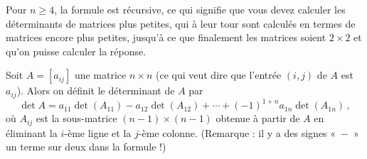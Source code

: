 Pour $n\geq 4$, la formule est récursive, ce qui signifie que vous devez calculer 
les déterminants de matrices plus petites, qui à leur tour sont calculés en termes 
de matrices encore plus petites, jusqu'à ce que finalement les matrices soient $2\times 2$ et qu'on puisse calculer la réponse.

\begin{definition}
Soit $A = [a_{ij}]$ une matrice $n\times n$ (ce qui veut dire que l'entr\'ee $(i,j)$ de $A$ est $a_{ij}$).
Alors on d\'efinit le d\'eterminant de $A$ par
$$
\det A = a_{11}\det(A_{11}) - a_{12}\det(A_{12}) + \cdots + (-1)^{1+n}a_{1n}\det(A_{1n})\,,
$$
o\`u $A_{ij}$ est la sous-matrice $(n-1)\times(n-1)$  obtenue à partir de $A$ en \'eliminant la $i$-\`eme ligne et la $j$-\`eme colonne. (Remarque : il y a des signes «~$-$~» un terme sur deux dans la formule !)
\end{definition}

